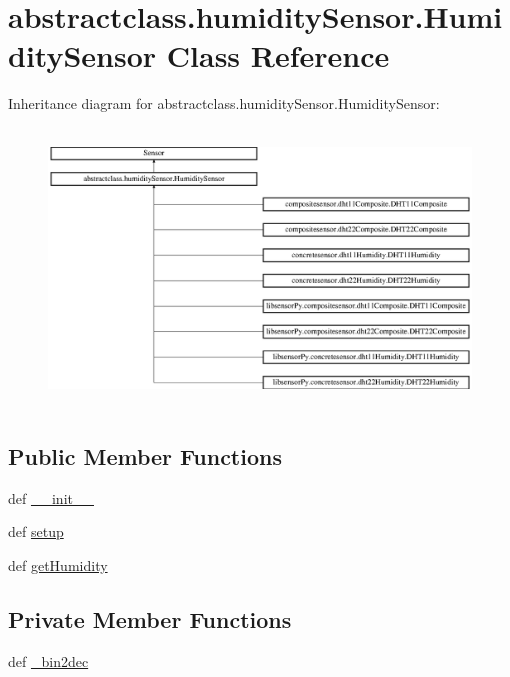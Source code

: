 \hypertarget{classabstractclass_1_1humiditySensor_1_1HumiditySensor}{}\section{abstractclass.\+humidity\+Sensor.\+Humidity\+Sensor Class Reference}
\label{classabstractclass_1_1humiditySensor_1_1HumiditySensor}
Inheritance diagram for abstractclass.\+humidity\+Sensor.\+Humidity\+Sensor\+:\begin{figure}[H]
\begin{center}
\leavevmode
\includegraphics[height=7.407408cm]{classabstractclass_1_1humiditySensor_1_1HumiditySensor}
\end{center}
\end{figure}
\subsection*{Public Member Functions}
\begin{DoxyCompactItemize}
\item 
def \hyperlink{classabstractclass_1_1humiditySensor_1_1HumiditySensor_a5c944d3e32e89fe99943c78add16be2a}{\+\_\+\+\_\+init\+\_\+\+\_\+}
\item 
def \hyperlink{classabstractclass_1_1humiditySensor_1_1HumiditySensor_a6e066dd4b8e48273c64e850b1b59d772}{setup}
\item 
def \hyperlink{classabstractclass_1_1humiditySensor_1_1HumiditySensor_a70bb0eac53e20f1547d7daef99f83702}{get\+Humidity}
\end{DoxyCompactItemize}
\subsection*{Private Member Functions}
\begin{DoxyCompactItemize}
\item 
def \hyperlink{classabstractclass_1_1humiditySensor_1_1HumiditySensor_a23d867a3095379d4074381e4ef2166fc}{\+\_\+bin2dec}
\end{DoxyCompactItemize}
